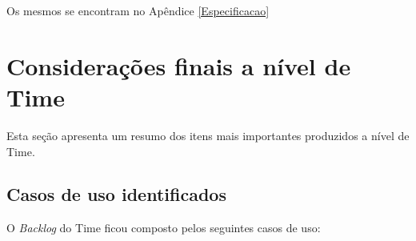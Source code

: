   
  Os mesmos se encontram no Apêndice \ref{Especificacao}
  
  \section{Considerações finais a nível de Time}
    
    Esta seção apresenta um resumo dos itens mais importantes produzidos a nível de Time.
    
    \subsection{Casos de uso identificados} 
      
      O \textit{Backlog} do Time ficou composto pelos seguintes casos de uso:
      
      